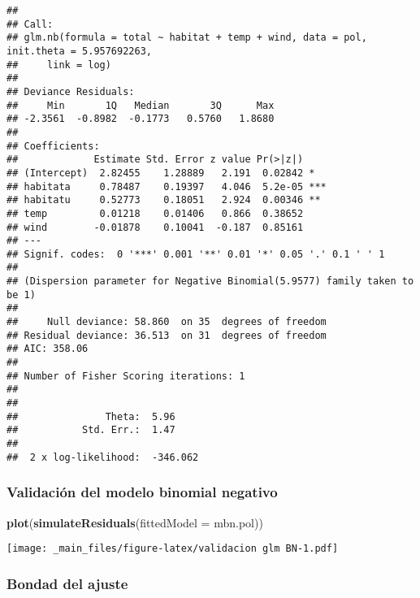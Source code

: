 \documentclass[
]{book}
\newenvironment{Shaded}{\begin{snugshade}}{\end{snugshade}}
\newcommand{\CommentTok}[1]{\textcolor[rgb]{0.56,0.35,0.01}{\textit{#1}}}
\newcommand{\DataTypeTok}[1]{\textcolor[rgb]{0.13,0.29,0.53}{#1}}
\newcommand{\DecValTok}[1]{\textcolor[rgb]{0.00,0.00,0.81}{#1}}
\newcommand{\KeywordTok}[1]{\textcolor[rgb]{0.13,0.29,0.53}{\textbf{#1}}}
\newcommand{\NormalTok}[1]{#1}
\newcommand{\OperatorTok}[1]{\textcolor[rgb]{0.81,0.36,0.00}{\textbf{#1}}}
\newcommand{\StringTok}[1]{\textcolor[rgb]{0.31,0.60,0.02}{#1}}
\begin{document}
\begin{verbatim}
## 
## Call:
## glm.nb(formula = total ~ habitat + temp + wind, data = pol, init.theta = 5.957692263, 
##     link = log)
## 
## Deviance Residuals: 
##     Min       1Q   Median       3Q      Max  
## -2.3561  -0.8982  -0.1773   0.5760   1.8680  
## 
## Coefficients:
##             Estimate Std. Error z value Pr(>|z|)    
## (Intercept)  2.82455    1.28889   2.191  0.02842 *  
## habitata     0.78487    0.19397   4.046  5.2e-05 ***
## habitatu     0.52773    0.18051   2.924  0.00346 ** 
## temp         0.01218    0.01406   0.866  0.38652    
## wind        -0.01878    0.10041  -0.187  0.85161    
## ---
## Signif. codes:  0 '***' 0.001 '**' 0.01 '*' 0.05 '.' 0.1 ' ' 1
## 
## (Dispersion parameter for Negative Binomial(5.9577) family taken to be 1)
## 
##     Null deviance: 58.860  on 35  degrees of freedom
## Residual deviance: 36.513  on 31  degrees of freedom
## AIC: 358.06
## 
## Number of Fisher Scoring iterations: 1
## 
## 
##               Theta:  5.96 
##           Std. Err.:  1.47 
## 
##  2 x log-likelihood:  -346.062
\end{verbatim}

\hypertarget{validaciuxf3n-del-modelo-binomial-negativo}{%
\subsubsection{Validación del modelo binomial negativo}\label{validaciuxf3n-del-modelo-binomial-negativo}}

\begin{Shaded}
\begin{Highlighting}[]
\KeywordTok{plot}\NormalTok{(}\KeywordTok{simulateResiduals}\NormalTok{(}\DataTypeTok{fittedModel =}\NormalTok{ mbn.pol))}
\end{Highlighting}
\end{Shaded}

\texttt{[image: \_main\_files/figure-latex/validacion glm BN-1.pdf]}

\hypertarget{bondad-del-ajuste-2}{%
\subsubsection{Bondad del ajuste}\label{bondad-del-ajuste-2}}

\begin{Shaded}
\end{Shaded}
\end{document}
